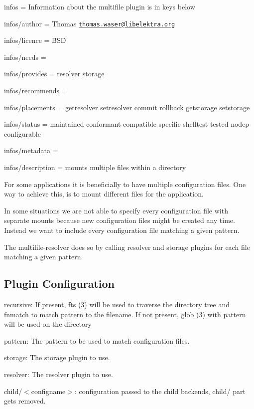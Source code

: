 
\begin{DoxyItemize}
\item infos = Information about the multifile plugin is in keys below
\item infos/author = Thomas \href{mailto:thomas.waser@libelektra.org}{\tt thomas.\+waser@libelektra.\+org}
\item infos/licence = B\+SD
\item infos/needs =
\item infos/provides = resolver storage
\item infos/recommends =
\item infos/placements = getresolver setresolver commit rollback getstorage setstorage
\item infos/status = maintained conformant compatible specific shelltest tested nodep configurable
\item infos/metadata =
\item infos/description = mounts multiple files within a directory
\end{DoxyItemize}

For some applications it is beneficially to have multiple configuration files. One way to achieve this, is to mount different files for the application.

In some situations we are not able to specify every configuration file with separate mounts because new configuration files might be created any time. Instead we want to include every configuration file matching a given pattern.

The multifile-\/resolver does so by calling resolver and storage plugins for each file matching a given pattern.

\subsection*{Plugin Configuration}


\begin{DoxyItemize}
\item {\ttfamily recursive}\+: If present, fts (3) will be used to traverse the directory tree and fnmatch to match {\ttfamily pattern} to the filename. If not present, glob (3) with {\ttfamily pattern} will be used on the directory
\item {\ttfamily pattern}\+: The pattern to be used to match configuration files.
\item {\ttfamily storage}\+: The storage plugin to use.
\item {\ttfamily resolver}\+: The resolver plugin to use.
\item \textquotesingle{}child/$<$configname$>$\textquotesingle{}\+: configuration passed to the child backends, {\ttfamily child/} part gets removed.
\end{DoxyItemize}


